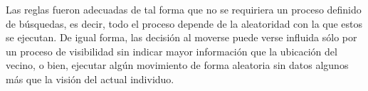   Las reglas fueron adecuadas de tal forma que no se requiriera un proceso definido de búsquedas, es decir, todo el proceso depende de la aleatoridad con la que estos se ejecutan. De igual forma, las decisión al moverse puede verse influida sólo por un proceso de visibilidad sin indicar mayor información que la ubicación del vecino, o bien, ejecutar algún movimiento de forma aleatoria sin datos algunos más que la visión del actual individuo.
